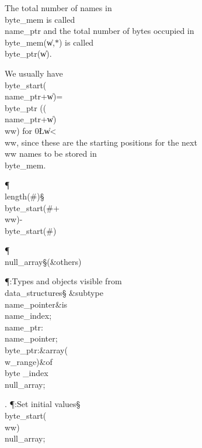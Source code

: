 The total number of names in \\{byte\_mem}
is called \\{name\_ptr} and the total number of bytes occupied in
\\{byte\_mem}\?(\?\|w\?,\?\hbox{$*$}\?)\? is called \\{byte\_ptr}\?(\?\|w\?)\?.

We usually have \\{byte\_start}\?(\?\\{name\_ptr}\?+\?\|w\?)=\?\\{byte\_ptr}%
\?((\?\\{name\_ptr}\?+\?\|w\?)\?\\{ww}\?)\?
for 0\?\L\?\|w\?<\?\\{ww}, since these are the starting positions for the next %
\\{ww}
names to be stored in \\{byte\_mem}.

\Y\P\4\D\\{length}\?\1(\?\#\?\2)\S\?\\{byte\_start}\?\1(\?\#\?+\?\\{ww}\?\2)-\?%
\\{byte\_start}\?\1(\?\#\?\2)\6
\?\par
\P\4\D\\{null\_array}\?\S\1(\?\&{others}\?\8\KR{}\?\2)\6
\?\par
\Y\P\?\4:Types and objects visible from \\{data\_structures}\X\mathrel{+}\S%
\?\6
\&{subtype}\8\\{name\_pointer}\8\&{is}\8\\{name\_index};\7
\\{name\_ptr}\?:\?\\{name\_pointer}\?\K{};\6
\\{byte\_ptr}\?:\1\&{array}\8\1(\?\\{w\_range}\?\2)\2\8\&{of}\?\8\\{byte%
\_index}\?\K\?\\{null\_array};\par
\fi

. \P\?:Set initial values\X\mathrel{+}\S\?\6
\\{byte\_start}\?\1(\?\to\?\\{ww}\?\2)\K\?\\{null\_array};\par
\fi

